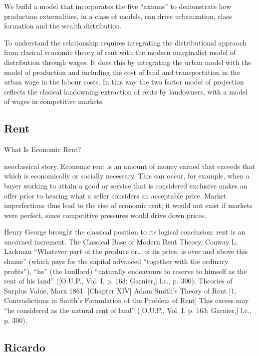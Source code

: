 We build a model that incorporates the five “axioms” to demonstrate how production externalities, in a class of models, can drive urbanization, class formation and the wealth distribution.

To understand the relationship requires integrating the distributional appraoch from clasical economic theory of rent with the modern marginalist model of distribution through wages. It does this by integrating the urban model with the model of production and including the cost of land and transportation in the urban wage in the labour costs. 
In this way the two factor model of projection reflects the clasical landowning extraction of rents by landowners, with a model of wages in competitive markets. 

\subsection{Rent}

 What Is Economic Rent?






neoclassical story.
Economic rent is an amount of money earned that exceeds that which is economically or socially necessary. This can occur, for example, when a buyer working to attain a good or service that is considered exclusive makes an offer prior to hearing what a seller considers an acceptable price. Market imperfections thus lead to the rise of economic rent; it would not exist if markets were perfect, since competitive pressures would drive down prices. 



Henry George brought the classical position to its logical conclusion: rent is an unearned increment. The Classical Base of Modern Rent Theory, Conway L. Lackman
“Whatever part of the produce or… of its price, is over and above this shame” (which pays for the capital advanced “together with the ordinary profits”), “he” (the landlord) “naturally endeavours to reserve to himself as the rent of his land” ([O.U.P., Vol. I, p. 163; Garnier,]  
l.c., p. 300). Theories of Surplus Value, Marx 1861. [Chapter XIV]  
 Adam Smith’s Theory of Rent [1.  Contradictions in Smith’s Formulation of the Problem of Rent]
This excess may “he considered as the natural rent of land” ([O.U.P., Vol. I, p. 163; Garnier,]
l.c., p. 300).


 \subsection{Ricardo}
 
